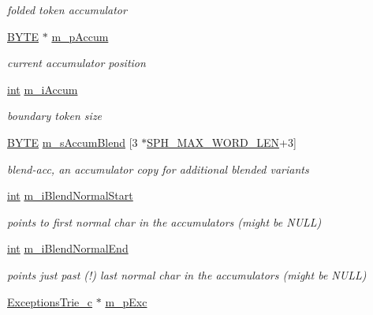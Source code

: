 \begin{DoxyCompactItemize}
\begin{DoxyCompactList}\small\item\em folded token accumulator \end{DoxyCompactList}\item 
\hyperlink{sphinxstd_8h_a4ae1dab0fb4b072a66584546209e7d58}{B\-Y\-T\-E} $\ast$ \hyperlink{classCSphTokenizerBase_a39a6d21608e3114e25638e1a4b8c4ec2}{m\-\_\-p\-Accum}
\begin{DoxyCompactList}\small\item\em current accumulator position \end{DoxyCompactList}\item 
\hyperlink{sphinxexpr_8cpp_a4a26e8f9cb8b736e0c4cbf4d16de985e}{int} \hyperlink{classCSphTokenizerBase_af4c77469a943d78f19f53ba5726ec734}{m\-\_\-i\-Accum}
\begin{DoxyCompactList}\small\item\em boundary token size \end{DoxyCompactList}\item 
\hyperlink{sphinxstd_8h_a4ae1dab0fb4b072a66584546209e7d58}{B\-Y\-T\-E} \hyperlink{classCSphTokenizerBase_abde0beb6b6b92275aa23bf65813b5c18}{m\-\_\-s\-Accum\-Blend} \mbox{[}3 $\ast$\hyperlink{sphinx_8h_ab0f6d383751adea7c80ed4ff4c36532c}{S\-P\-H\-\_\-\-M\-A\-X\-\_\-\-W\-O\-R\-D\-\_\-\-L\-E\-N}+3\mbox{]}
\begin{DoxyCompactList}\small\item\em blend-\/acc, an accumulator copy for additional blended variants \end{DoxyCompactList}\item 
\hyperlink{sphinxexpr_8cpp_a4a26e8f9cb8b736e0c4cbf4d16de985e}{int} \hyperlink{classCSphTokenizerBase_ab799f3465135203b6b96f5546dd3f300}{m\-\_\-i\-Blend\-Normal\-Start}
\begin{DoxyCompactList}\small\item\em points to first normal char in the accumulators (might be N\-U\-L\-L) \end{DoxyCompactList}\item 
\hyperlink{sphinxexpr_8cpp_a4a26e8f9cb8b736e0c4cbf4d16de985e}{int} \hyperlink{classCSphTokenizerBase_a2fb10f257a37a51c31ee8fcb01155467}{m\-\_\-i\-Blend\-Normal\-End}
\begin{DoxyCompactList}\small\item\em points just past (!) last normal char in the accumulators (might be N\-U\-L\-L) \end{DoxyCompactList}\item 
\hyperlink{classExceptionsTrie__c}{Exceptions\-Trie\-\_\-c} $\ast$ \hyperlink{classCSphTokenizerBase_af89cb7eaf47a82eb139c43be0b19827f}{m\-\_\-p\-Exc}

\end{DoxyCompactItemize}
